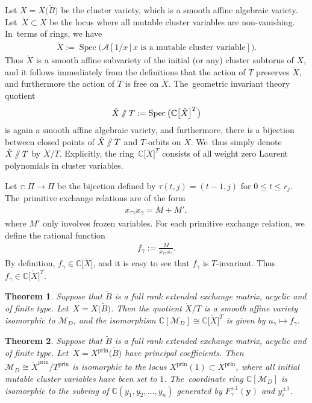\documentclass[10pt,a4paper]{amsart}
\def\C{{\mathbb C}}
\def\A{{\mathcal{A}}}
\def\Xo{{\mathring{X}}}
\def\Spec{\operatorname{Spec}}
\def\prin{{\operatorname{prin}}}
\def\tB{{\tilde B}}
\def\M{{\mathcal{M}}}
\def\tB{{\tilde B}}
\def\y{{\mathbf y}}
\newcommand{\sslash}{\mathbin{/\mkern-6mu/}}
\numberwithin{equation}{section}
\newtheorem{Theorem}{Theorem}[section]
\begin{document}
Let $X = X\big(\tB\big)$ be the cluster variety, which is a smooth affine algebraic variety. Let~$\Xo \subset X$ be the locus where all mutable cluster variables are non-vanishing. In~terms of rings, we have
\begin{gather*}
\Xo:= \Spec\big(\A[1/x \,|\, x \text{ is a mutable cluster variable}]\big).
\end{gather*}
Thus $\Xo$ is a smooth affine subvariety of the initial (or any) cluster subtorus of $X$, and it follows immediately from the definitions that the action of $T$ preserves $\Xo$, and furthermore the action of $T$ is free on $\Xo$. The~geometric invariant theory quotient
\begin{gather*}
\Xo \sslash T:= \Spec\big(\C\big[\Xo\big]^T\big)
\end{gather*}
is again a smooth affine algebraic variety, and furthermore, there is a bijection between closed points of $\Xo \sslash T$ and $T$-orbits on $\Xo$. We~thus simply denote $\Xo\sslash T$ by $\Xo/T$. %
Explicitly, the ring~$\C\big[\Xo\big]^T$ consists of all weight zero Laurent polynomials in cluster variables.

\bigskip{}
Let $\tau\colon \Pi \to \Pi$ be the bijection defined by $\tau(t,j) = (t-1,j)$ for $0 \leq t \leq r_j$. The~primitive exchange relations are of the form
\begin{gather*}
x_{\tau \gamma} x_{\gamma} = M + M',
\end{gather*}
where $M'$ only involves frozen variables. For each primitive exchange relation, we define the rational function
\begin{gather*}
f_\gamma := \frac{M}{x_{\tau \gamma} x_{\gamma}}.
\end{gather*}
By definition, $f_\gamma \in \C\big[\Xo\big]$, and it is easy to see that $f_\gamma$ is $T$-invariant. Thus $f_\gamma \in \C\big[\Xo\big]^T$.

\begin{Theorem}\label{thm:fullrank}
Suppose that $\tB$ is a full rank extended exchange matrix, acyclic and of finite type. Let~$X= X\big(\tB\big)$. Then the quotient $\Xo/T$ is a smooth affine variety isomorphic to $\M_D$, and the isomorphism $\C[\M_D] \cong \C\big[\Xo\big]^T$ is given by $u_\gamma \mapsto f_\gamma$.
\end{Theorem}

\begin{Theorem}\label{thm:principal}
Suppose that $\tB$ is a full rank extended exchange matrix, acyclic and of finite type. Let~$X= X^\prin\big(\tB\big)$ have principal coefficients. Then $\M_D \cong \Xo^\prin/T^\prin$ is isomorphic to the locus $X^\prin(1) \subset X^\prin$, where all initial mutable cluster variables have been set to $1$. The~coordinate ring $\C[\M_D]$ is isomorphic to the subring of $\C(y_1,y_2,\dots,y_n)$ generated by $F_\gamma^{\pm 1}(\y)$ and $y_i^{\pm 1}$.
\end{Theorem}
\end{document}
